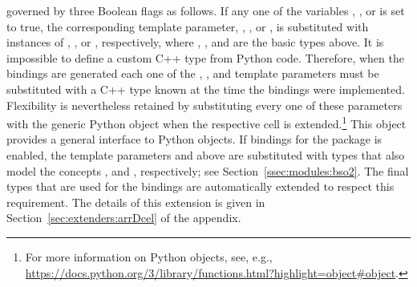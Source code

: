 \begin{itemize}
  governed by three \cmake{} Boolean flags as follows. If any one of
  the \cmake{} variables ,
  , or
   is set to true, the
  corresponding template parameter, ,
  , or , is substituted with instances
  of ,
  , or
  , respectively, where
  , , and  are the
  basic types above.
  It is impossible to define a custom C++ type from Python
  code. Therefore, when the bindings are generated each one of the
  , , and
   template parameters must be substituted with
  a C++ type known at the time the bindings were
  implemented. Flexibility is nevertheless retained by substituting
  every one of these parameters with the generic Python object
   when the respective cell is
  extended.\footnote{For more information on Python objects, see,
    e.g.,
    \url{https://docs.python.org/3/library/functions.html?highlight=object\#object}.}
  This object provides a general interface to Python objects.
  If bindings for the \iiDRegularizedBooleanSetOperationsPackage{}
  package is enabled, the template parameters  and
   above are substituted with types that also model
  the concepts , and
  , respectively; see
  Section~\ref{ssec:modules:bso2}. The final types that are used
  for the bindings are automatically extended to respect this requirement.
  The details of this extension is given in
  Section~\ref{sec:extenders:arrDcel} of the appendix.
\end{itemize}

